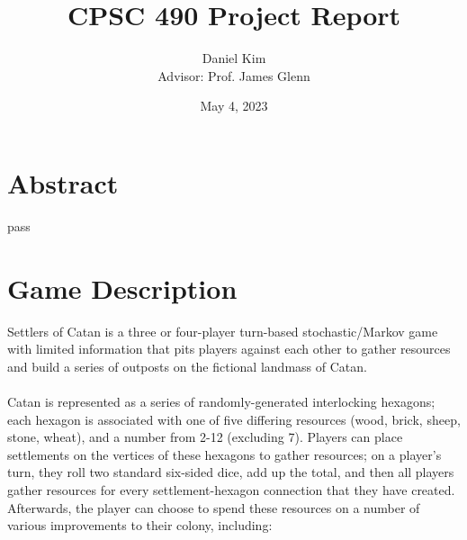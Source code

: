 \documentclass[a4paper, 11pt]{article}
\title{CPSC 490 Project Report}
\author{Daniel Kim\\{Advisor: Prof. James Glenn}}
\date{May 4, 2023}
\begin{document}
\maketitle

\section{Abstract}
pass

\section{Game Description}

Settlers of Catan is a three or four-player turn-based stochastic/Markov game with limited information that pits players against each other to gather resources and build a series of outposts on the fictional landmass of Catan. 
\\ \\
\noindent Catan is represented as a series of randomly-generated interlocking hexagons; each hexagon is associated with one of five differing resources (wood, brick, sheep, stone, wheat), and a number from 2-12 (excluding 7). Players can place settlements on the vertices of these hexagons to gather resources; on a player's turn, they roll two standard six-sided dice, add up the total, and then all players gather resources for every settlement-hexagon connection that they have created. Afterwards, the player can choose to spend these resources on a number of various improvements to their colony, including:
\end{document}
